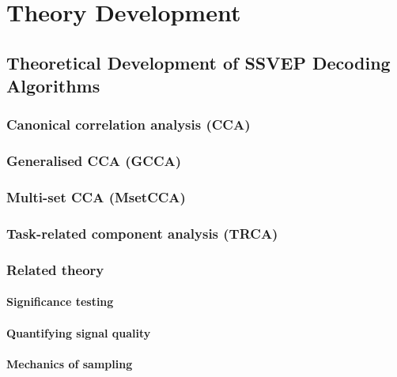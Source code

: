 \chapter{Theory Development}

\graphicspath{ {report/Chapter3/assets/} } 

\section{Theoretical Development of SSVEP Decoding Algorithms}

\subsection{Canonical correlation analysis (CCA)}

\subsection{Generalised CCA (GCCA)}

\subsection{Multi-set CCA (MsetCCA)}

\subsection{Task-related component analysis (TRCA)}

\subsection{Related theory}
\subsubsection{Significance testing}
\subsubsection{Quantifying signal quality}
\subsubsection{Mechanics of sampling}